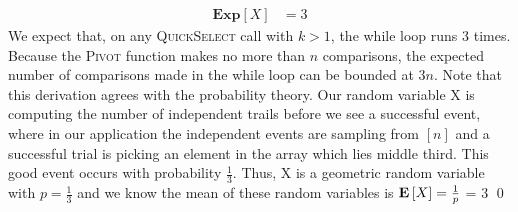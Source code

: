 \documentclass[12pt]{article}
\begin{document}
\begin{solution}
\begin{solution}
\begin{subprob}
\begin{align*}
            \textbf{Exp}[X] &= 3
        \end{align*}
        We expect that, on any \textsc{QuickSelect} call with $k > 1$, the while loop runs $3$ times. Because the \textsc{Pivot} function makes no more than $n$ comparisons, the expected number of comparisons made in the while loop can be bounded at $3n$. Note that this derivation agrees with the probability theory. Our random variable X is computing the number of independent trails before we see a successful event, where in our application the independent events are sampling from $[n]$ and a successful trial is picking an element in the array which lies middle third. This good event occurs with probability $\frac{1}{3}$. Thus, X is a geometric random variable with $p=\frac{1}{3}$ and we know the mean of these random variables is $\mathbf{E}\left[X\right]=\frac{1}{p}$ = 3 \qed


\end{subprob}
\end{solution}
\end{solution}
\end{document}

